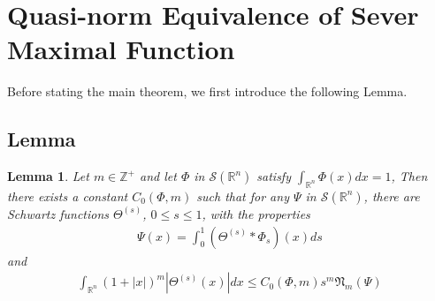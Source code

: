 \documentclass[12pt]{article}  %
\numberwithin{equation}{subsection}
\newtheorem{lemma}[thm]{Lemma}
\theoremstyle{plain}
\begin{document}
\section{Quasi-norm Equivalence of Sever Maximal Function}
Before stating the main theorem, we first introduce the following Lemma.
\subsection{Lemma}
\begin{lemma}
	Let $m \in \mathbb{Z}^+$ and let $\varPhi$ in $\mathcal{S}(\mathbb{R}^n)$ satisfy $\int_{\mathbb{R}^n}\varPhi(x)dx = 1$, Then there exists a constant $C_0(\varPhi, m)$ such that for any $\varPsi$ in $\mathcal{S}(\mathbb{R}^n)$, there are Schwartz functions $\varTheta^{(s)}$, $0\le s\le 1$, with the properties
	\begin{align}
		\varPsi(x) = \int_{0}^{1}(\varTheta^{(s)}*\varPhi_s)(x)ds \label{lemma1}
	\end{align}
	and
	\begin{align}
		\int_{\mathbb{R}^n}(1+|x|)^m\left| \varTheta^{(s)}(x) \right| dx \le C_0(\varPhi, m)s^m\mathfrak{N}_m(\varPsi) \label{lemma2}
	\end{align}
\end{lemma}
\end{document}
